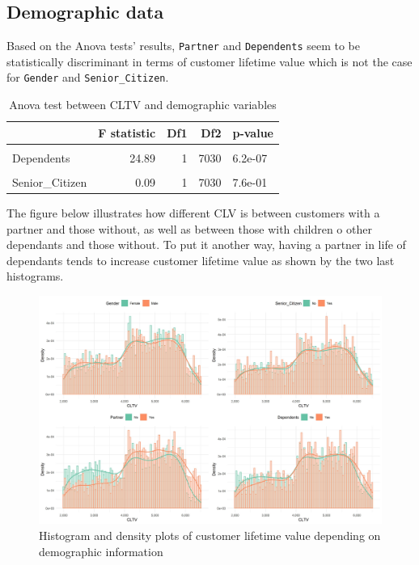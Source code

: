 \documentclass[
]{book}
\begin{document}
\hypertarget{demographic-data-1}{%
\subsection*{Demographic data}\label{demographic-data-1}}

Based on the Anova tests' results, \texttt{Partner} and \texttt{Dependents} seem to be statistically discriminant in terms of customer lifetime value which is not the case for \texttt{Gender} and \texttt{Senior\_Citizen}.

\begin{table}[H]

\caption{\label{tab:aovdemographics}Anova test between CLTV and demographic variables}
\centering
\begin{tabular}[t]{lrrrl}
\toprule
  & F statistic & Df1 & Df2 & p-value\\
\midrule
\cellcolor{gray!6}{Partner} & \cellcolor{gray!6}{139.76} & \cellcolor{gray!6}{1} & \cellcolor{gray!6}{7030} & \cellcolor{gray!6}{6e-32}\\
Dependents & 24.89 & 1 & 7030 & 6.2e-07\\
\cellcolor{gray!6}{Gender} & \cellcolor{gray!6}{0.39} & \cellcolor{gray!6}{1} & \cellcolor{gray!6}{7030} & \cellcolor{gray!6}{5.3e-01}\\
Senior\_Citizen & 0.09 & 1 & 7030 & 7.6e-01\\
\bottomrule
\end{tabular}
\end{table}

The figure below illustrates how different CLV is between customers with a partner and those without, as well as between those with children o other dependants and those without. To put it another way, having a partner in life of dependants tends to increase customer lifetime value as shown by the two last histograms.

\begin{figure}

{\centering \includegraphics[width=50in]{./imgs/cltv_demographics_plots} 

}

\caption{Histogram and density plots of customer lifetime value depending on demographic information}\label{fig:cltvdemographics}
\end{figure}
\end{document}
